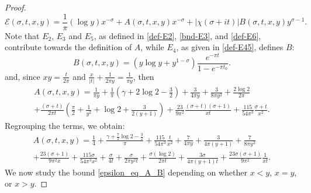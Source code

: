 \documentclass[11pt,letterpaper,oneside,reqno]{amsart}
\renewcommand{\^}[1]{\widehat{#1}}
\newcommand{\s}{\sigma}
\numberwithin{equation}{section}
\theoremstyle{remark}
\begin{document}
\begin{proof}
\begin{equation}
    \mathcal{E}(\s,t,x,y)= \frac1{\pi}(\log y)x^{-\s}  +A(\s,t,x,y)x^{-\s}+ |\chi(\sigma+it)| B(\s,t,x,y)    y^{\s-1}. \label{epsilon_eq_A_B}
\end{equation}
Note that $E_2$, $E_3$ and $E_{5}$, as defined in \eqref{def-E2}, \eqref{bnd-E3}, and \eqref{def-E6}, contribute towards the definition of $A$, while $E_{4}$, as given in \eqref{def-E45}, defines $B$:
\begin{equation}\label{def:B(s,t,x,y)}
B(\s,t,x,y)=   \left( y\log y + y^{1-\sigma}  \right) \frac{e^{-\pi t}}{1 - e^{-\pi t_0}}.
\end{equation}
and, since $xy=\frac{t}{2\pi}$ and $\frac{x}{|t|}+\frac{1}{2\pi y} 
= \frac{1}{\pi y} $, then
\begin{multline}
A(\sigma,t,x,y) 
= \frac{1}{\pi y} 
+
\frac{1}{\pi}\left(\gamma+ 2 \log 2-\frac{3}{2}\right)  +\frac{3}{4\pi y} + \frac{3}{8\pi y^2}
 + \frac{2\log 2}{2\pi} \\+ \frac{(\sigma + t)}{2\pi t} \left(\frac{\pi}{2} + \frac{1}{y^2} + \log 2 + \frac{3}{2(y+1)}\right)  + \frac{23}{9\pi^2} \frac{(\sigma+t)(\sigma+1)}{xt} + \frac{115}{54\pi^3} \frac{\sigma+t}{x^2}.
\end{multline}
% 
Regrouping the terms, we obtain:
\begin{multline} \label{def:A(s,t,x,y)}
A(\sigma,t,x,y) 
=
\frac{1}4 +\frac{\gamma+ \frac72\log 2-\frac{3}{2}}{\pi} 
+ \frac{115}{54\pi^3} \frac{t}{x^2}
+ \frac{7}{4\pi y} +  \frac{3}{4\pi(y+1)}
+ \frac{7}{8\pi y^2} 
\\ + \frac{23(\sigma+1)}{9\pi^2 x} 
+ \frac{115 \sigma}{54\pi^3 x^2}
 + \frac{\sigma }{4 t}
 + \frac{\sigma }{2\pi y^2 t} 
 + \frac{ \sigma  (\log 2 )}{2\pi t} 
 + \frac{ 3 \sigma }{4\pi (y+1) t}
 + \frac{23\sigma (\sigma+1)}{9\pi^2} \frac{1}{xt} .
\end{multline}
%
We now study the bound \eqref{epsilon_eq_A_B} depending on whether $x< y$, $x=y$, or $x>y$. 


\end{proof}
\end{document}
